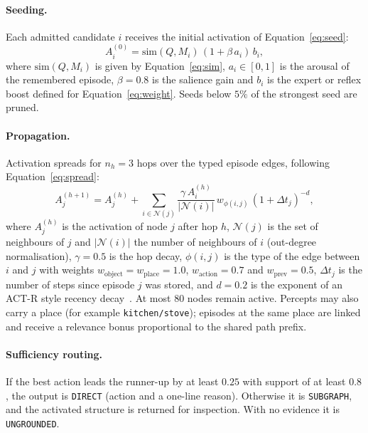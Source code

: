\documentclass[12pt,a4paper,oneside]{report}
\newcommand{\code}[1]{\texttt{\small #1}}
\begin{document}
\paragraph{Seeding.} Each admitted candidate $i$ receives the initial activation of Equation~\eqref{eq:seed}:
\begin{equation}
  A_i^{(0)} = \mathrm{sim}(Q, M_i)\,(1 + \beta\,a_i)\,b_i,
  \label{eq:seed}
\end{equation}
where $\mathrm{sim}(Q, M_i)$ is given by Equation~\eqref{eq:sim}, $a_i \in [0,1]$ is the arousal of the remembered episode, $\beta = 0.8$ is the salience gain and $b_i$ is the expert or reflex boost defined for Equation~\eqref{eq:weight}. Seeds below $5\%$ of the strongest seed are pruned.

\paragraph{Propagation.} Activation spreads for $n_h = 3$ hops over the typed episode edges, following Equation~\eqref{eq:spread}:
\begin{equation}
  A_j^{(h+1)} = A_j^{(h)} + \sum_{i \in \mathcal{N}(j)} \frac{\gamma\, A_i^{(h)}}{|\mathcal{N}(i)|}\, w_{\phi(i,j)}\,(1 + \Delta t_j)^{-d},
  \label{eq:spread}
\end{equation}
where $A_j^{(h)}$ is the activation of node $j$ after hop $h$, $\mathcal{N}(j)$ is the set of neighbours of $j$ and $|\mathcal{N}(i)|$ the number of neighbours of $i$ (out-degree normalisation), $\gamma = 0.5$ is the hop decay, $\phi(i,j)$ is the type of the edge between $i$ and $j$ with weights $w_{\text{object}} = w_{\text{place}} = 1.0$, $w_{\text{action}} = 0.7$ and $w_{\text{prev}} = 0.5$, $\Delta t_j$ is the number of steps since episode $j$ was stored, and $d = 0.2$ is the exponent of an ACT-R style recency decay~\cite{anderson2004}. At most 80 nodes remain active. Percepts may also carry a place (for example \code{kitchen/stove}); episodes at the same place are linked and receive a relevance bonus proportional to the shared path prefix.

\paragraph{Sufficiency routing.} If the best action leads the runner-up by at least $0.25$ with support of at least $0.8$, the output is \code{DIRECT} (action and a one-line reason). Otherwise it is \code{SUBGRAPH}, and the activated structure is returned for inspection. With no evidence it is \code{UNGROUNDED}.
\end{document}
